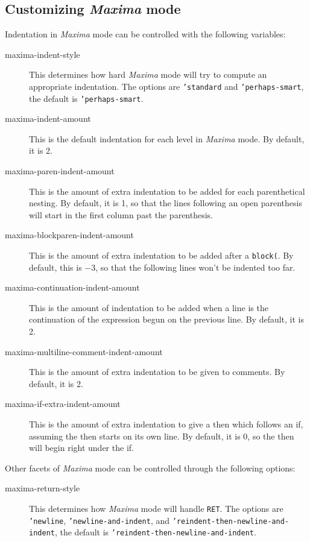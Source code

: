\documentclass{article}
\newcommand{\mx}{\textsl{\sffamily Maxima}}
\newcommand{\hyph}{-\hspace{0pt}}
\begin{document}
\subsection{Customizing \mx{} mode}
\label{app:custmxmode}

Indentation in \mx{} mode can be controlled with the following
variables:
\begin{description}
\item[maxima-indent-style] This determines how hard \mx{} mode will
  try to compute an appropriate indentation.  The options are 
  \texttt{'standard} and \texttt{'perhaps-smart}, the default is
  \texttt{'perhaps-smart}.
\item[maxima-indent-amount] This is the default indentation for each
  level in \mx{} mode.  By default, it is 2.
\item[maxima-paren-indent-amount] This is the amount of extra
  indentation to be added for each parenthetical nesting.  By default,
  it is 1, so that the lines following an open parenthesis will start
  in the first column past the parenthesis.
\item[maxima-blockparen-indent-amount] This is the amount of extra
  indentation to be added after a \texttt{block(}.  By default, this
  is $-3$, so that the following lines won't be indented too far.
\item[maxima-continuation-indent-amount] This is the amount of
  indentation to be added when a line is the continuation of the
  expression begun on the previous line.  By default, it is 2.
\item[maxima-multiline-comment-indent-amount] This is the amount of
  extra indentation to be given to comments.  By default, it is 2.
\item[maxima-if-extra-indent-amount] This is the amount of extra
  indentation to give a then which follows an if, assuming the then
  starts on its own line.  By default, it is 0, so the then will begin
  right under the if.
\end{description}

Other facets of \mx{} mode can be controlled through the following
options: 
\begin{description}
\item[maxima-return-style] This determines how \mx{} mode will handle
  \texttt{RET}.  The options are \texttt{'newline},
  \texttt{'newline\hyph{}and\hyph{}indent}, and
  \texttt{'reindent\hyph{}then\hyph{}newline\hyph{}and\hyph{}indent}, the default is
  \texttt{'reindent\hyph{}then\hyph{}newline\hyph{}and\hyph{}indent}.
\end{description}
\end{document}

